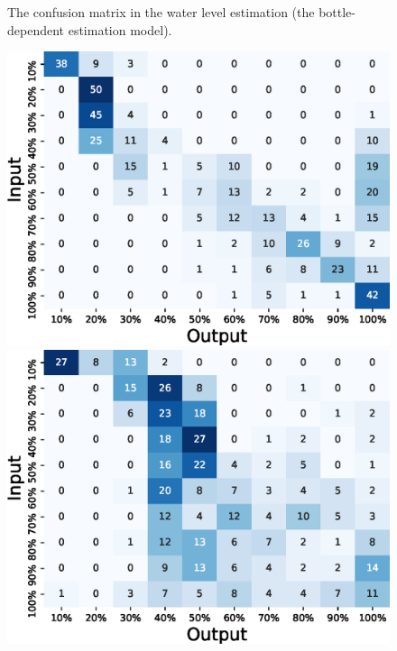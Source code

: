 \documentclass[sigconf]{acmart}
\begin{document}
\begin{figure}[!t]
\begin{minipage}[t]{0.32\linewidth}
  \end{minipage}
  \caption{The confusion matrix in the water level estimation (the bottle-dependent estimation model).}
  \label{fig:confusion_matrix_10_dependent}
\end{figure}

\begin{figure}[!t]
  \centering
  \begin{minipage}[t]{0.32\linewidth}
    \centering
    \includegraphics[width=0.9\linewidth]{figures/confusion_matrix_10_independent_coffee.eps}
  \end{minipage}
  \begin{minipage}[t]{0.32\linewidth}
    \centering
    \includegraphics[width=0.9\linewidth]{figures/confusion_matrix_10_independent_dishwashing.eps}

\end{minipage}
\end{figure}
\end{document}
